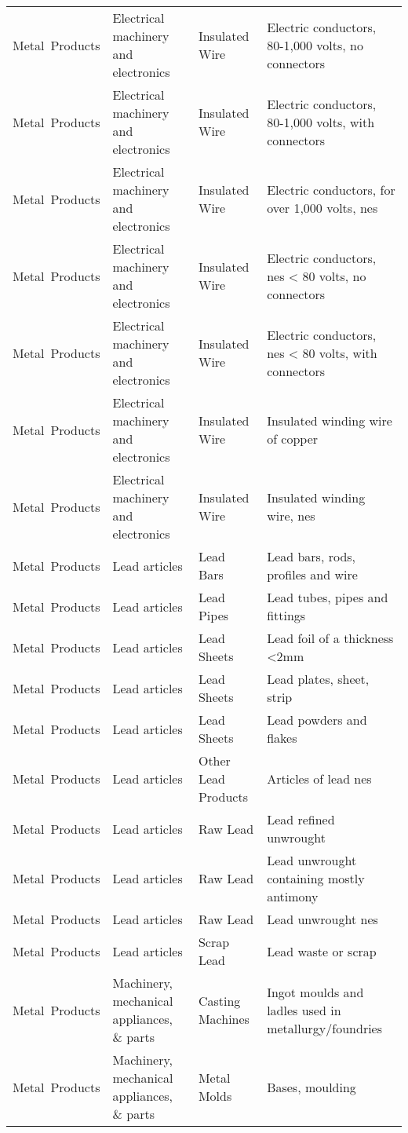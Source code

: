 \begin{appendices}
\begin{xltabular}{\textwidth}{|p{0.10\textwidth}|p{0.25\textwidth}|p{0.20\textwidth}|p{0.35\textwidth}|}
		Metal\ Products & Electrical machinery and electronics & Insulated Wire & Electric conductors, 80-1,000 volts, no connectors \\
		Metal\ Products & Electrical machinery and electronics & Insulated Wire & Electric conductors, 80-1,000 volts, with connectors \\
		Metal\ Products & Electrical machinery and electronics & Insulated Wire & Electric conductors, for over 1,000 volts, nes \\
		Metal\ Products & Electrical machinery and electronics & Insulated Wire & Electric conductors, nes < 80 volts, no connectors \\
		Metal\ Products & Electrical machinery and electronics & Insulated Wire & Electric conductors, nes < 80 volts, with connectors \\
		Metal\ Products & Electrical machinery and electronics & Insulated Wire & Insulated winding wire of copper \\
		Metal\ Products & Electrical machinery and electronics & Insulated Wire & Insulated winding wire, nes \\
		Metal\ Products & Lead articles & Lead Bars & Lead bars, rods, profiles and wire \\
		Metal\ Products & Lead articles & Lead Pipes & Lead tubes, pipes and fittings \\
		Metal\ Products & Lead articles & Lead Sheets & Lead foil of a thickness <2mm \\
		Metal\ Products & Lead articles & Lead Sheets & Lead plates, sheet, strip \\
		Metal\ Products & Lead articles & Lead Sheets & Lead powders and flakes \\
		Metal\ Products & Lead articles & Other Lead Products & Articles of lead nes \\
		Metal\ Products & Lead articles & Raw Lead & Lead refined unwrought \\
		Metal\ Products & Lead articles & Raw Lead & Lead unwrought containing mostly antimony \\
		Metal\ Products & Lead articles & Raw Lead & Lead unwrought nes \\
		Metal\ Products & Lead articles & Scrap Lead & Lead waste or scrap \\
		Metal\ Products & Machinery, mechanical appliances, \& parts & Casting Machines & Ingot moulds and ladles used in metallurgy/foundries \\
		Metal\ Products & Machinery, mechanical appliances, \& parts & Metal Molds & Bases, moulding \\

\end{xltabular}
\end{appendices}
